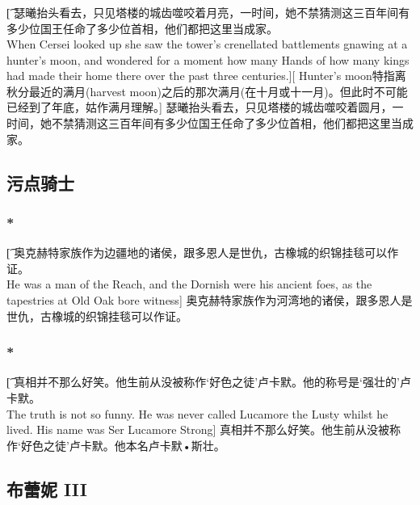 \documentclass[12pt,a4paper]{article}
\begin{document}
\subsubsection{}\t[
	瑟曦抬头看去，只见塔楼的城齿噬咬着月亮，一时间，她不禁猜测这三百年间有多少位国王任命了多少位首相，他们都把这里当成家。\\
	When Cersei looked up she saw the tower's crenellated battlements gnawing at a hunter's moon, and wondered for a moment how many Hands of how many kings had made their home there over the past three centuries.][
	Hunter's moon特指离秋分最近的满月(harvest moon)之后的那次满月(在十月或十一月)。但此时不可能已经到了年底，姑作满月理解。]
	瑟曦抬头看去，只见塔楼的城齿噬咬着圆月，一时间，她不禁猜测这三百年间有多少位国王任命了多少位首相，他们都把这里当成家。
	
\subsection{污点骑士}
\subsubsection{\color{red}*}\t[
	奥克赫特家族作为边疆地的诸侯，跟多恩人是世仇，古橡城的织锦挂毯可以作证。\\
	He was a man of the Reach, and the Dornish were his ancient foes, as the tapestries at Old Oak bore witness]
	奥克赫特家族作为河湾地的诸侯，跟多恩人是世仇，古橡城的织锦挂毯可以作证。
 
	
\subsubsection{\color{red}*}\t[
	真相并不那么好笑。他生前从没被称作‘好色之徒’卢卡默。他的称号是‘强壮的’卢卡默。\\
	The truth is not so funny. He was never called Lucamore the Lusty whilst he lived. His name was Ser Lucamore Strong]
	真相并不那么好笑。他生前从没被称作‘好色之徒’卢卡默。他本名卢卡默•斯壮。
\subsection{布蕾妮 III}
\end{document}
